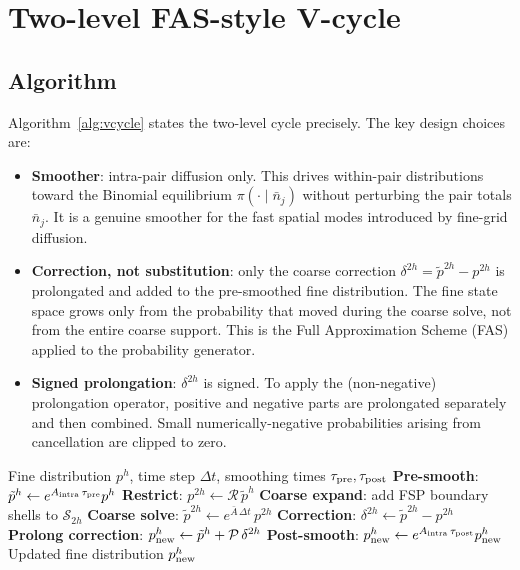 \documentclass[11pt]{article}
\newcommand{\R}{\mathcal{R}}
\newcommand{\Pcal}{\mathcal{P}}
\newcommand{\Sset}{\mathcal{S}}
\begin{document}
\section{Two-level FAS-style V-cycle}
\label{sec:vcycle}

\subsection{Algorithm}

Algorithm~\ref{alg:vcycle} states the two-level cycle precisely.
The key design choices are:
\begin{itemize}[itemsep=0.2em]
  \item \textbf{Smoother}: intra-pair diffusion only. This drives within-pair
    distributions toward the Binomial equilibrium $\pi(\cdot\mid \bar n_j)$
    without perturbing the pair totals $\bar n_j$. It is a
    genuine smoother for the fast spatial modes introduced by fine-grid
    diffusion.
  \item \textbf{Correction, not substitution}: only the coarse correction
    $\delta^{2h} = \tilde p^{2h} - p^{2h}$ is prolongated and added to the
    pre-smoothed fine distribution. The fine state space grows only from the
    probability that moved during the coarse solve, not from the entire coarse
    support. This is the Full Approximation Scheme (FAS) applied to the
    probability generator.
  \item \textbf{Signed prolongation}: $\delta^{2h}$ is signed. To apply the
    (non-negative) prolongation operator, positive and negative parts are
    prolongated separately and then combined. Small numerically-negative
    probabilities arising from cancellation are clipped to zero.
\end{itemize}

\begin{algorithm}[t]
\caption{Two-level FAS V-cycle for the RDME}
\label{alg:vcycle}
\begin{algorithmic}[1]
\REQUIRE Fine distribution $p^h$, time step $\Delta t$, smoothing times $\tau_{\rm pre}, \tau_{\rm post}$
\STATE \textbf{Pre-smooth}: $\tilde p^h \leftarrow e^{A_{\rm intra}\,\tau_{\rm pre}} p^h$
  \hfill {}
\STATE \textbf{Restrict}: $p^{2h} \leftarrow \R\,\tilde p^h$
\STATE \textbf{Coarse expand}: add FSP boundary shells to $\Sset_{2h}$
\STATE \textbf{Coarse solve}: $\tilde p^{2h} \leftarrow e^{\bar A\,\Delta t}\,p^{2h}$
\STATE \textbf{Correction}: $\delta^{2h} \leftarrow \tilde p^{2h} - p^{2h}$
\STATE \textbf{Prolong correction}: $p^h_{\rm new} \leftarrow \tilde p^h + \Pcal\,\delta^{2h}$
\STATE \textbf{Post-smooth}: $p^h_{\rm new} \leftarrow e^{A_{\rm intra}\,\tau_{\rm post}} p^h_{\rm new}$
\ENSURE Updated fine distribution $p^h_{\rm new}$
\end{algorithmic}
\end{algorithm}
\end{document}
